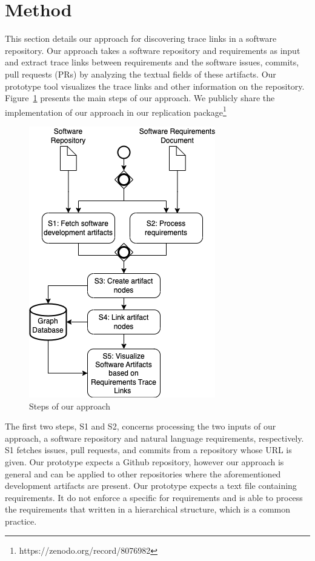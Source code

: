 \section{Method}
\label{sec:approach}

This section details our approach for discovering trace links in a software repository. Our approach takes a software repository and requirements as input and extract trace links between requirements and the software issues, commits, pull requests (PRs) by analyzing the textual fields of these artifacts. Our prototype tool visualizes the trace links and other information on the repository. Figure~\ref{fig:sys-flow} presents the main steps of our approach. We publicly share the implementation of our approach in our replication package\footnote{https://zenodo.org/record/8076982}

\begin{figure}[htb]
    \centering
    \includegraphics[width=0.65\linewidth]{figs/approach.png}
    \caption{Steps of our approach}
    \label{fig:sys-flow}
  \end{figure}

  The first two steps, \textsf{S1} and \textsf{S2}, concerns processing the two inputs of our approach, a software repository and natural language requirements, respectively. \textsf{S1} fetches issues, pull requests, and commits from a repository whose URL is given. Our prototype expects a Github repository, however our approach is general and can be applied to other repositories where the aforementioned development artifacts are present. %
  Our prototype expects a text file containing requirements. It do not enforce a specific for requirements and is able to process the requirements that written in a hierarchical structure, which is a common practice.

